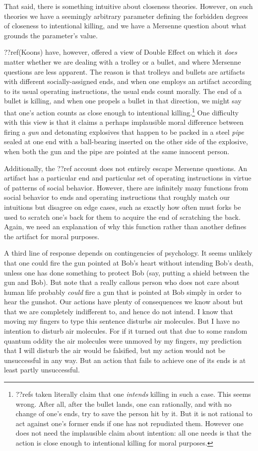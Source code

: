 That said, there is something intuitive about closeness theories. However, on such theories we have a seemingly arbitrary 
parameter defining the forbidden degrees of closeness to intentional killing, and we have a Mersenne question about what
grounds the parameter's value.

??ref(Koons) have, however, offered a view of Double Effect on which it \textit{does} matter whether we are dealing with 
a trolley or a bullet, and where Mersenne questions are less apparent. The reason is that trolleys and bullets are artifacts with different socially-assigned ends, and when 
one employs an artifact according to its usual operating instructions, the usual ends count morally. The end of a bullet is
killing, and when one propels a bullet in that direction, we might say that one's action counts as close enough to intentional 
killing.\footnote{??refs taken literally claim that one \textit{intends} killing in such a case. This seems wrong. After all,
after the bullet lands, one can rationally, and with no change of one's ends, try to save the person hit by it. 
But it is not rational to act against one's former ends if one has not repudiated them. However one does not need the implausible
claim about intention: all one needs is that the action is close enough to intentional killing for moral purposes.} One
difficulty with this view is that it claims a perhaps implausible moral difference between firing a \textit{gun} and detonating explosives that happen to be
packed in a steel \textit{pipe} sealed at one end with a ball-bearing inserted on the other side of the explosive,
when both the gun and the pipe are pointed at the same innocent person.  

Additionally, the ??ref account does not entirely escape Mersenne questions. An artifact has a particular
end and particular set of operating instructions in virtue of patterns of social behavior. However, there are infinitely many functions 
from social behavior to ends and operating instructions that roughly match our intuitions but disagree on edge cases, such as exactly
how often must forks be used to scratch one's back for them to acquire the end of scratching the back. Again, we need an explanation
of why this function rather than another defines the artifact for moral purposes.

A third line of response depends on contingencies of psychology. It seems unlikely that one could fire the gun pointed at Bob's heart
without intending Bob's death, unless one has done something to protect Bob (say, putting a shield between the gun and Bob). 
But note that a really callous person who does not care about human life probably \textit{could} fire a gun that is 
pointed at Bob simply in order to hear the gunshot. Our actions have
plenty of consequences we know about but that we are completely indifferent to, and hence do not intend. I know that moving
my fingers to type this sentence disturbs air molecules. But I have no intention to disturb air molecules. For if it turned out
that due to some random quantum oddity the air molecules were unmoved by my fingers, my prediction that I will disturb the
air would be falsified, but my action would not be unsuccessful in any way. But an action that fails to achieve one of its
ends is at least partly unsuccessful. 

